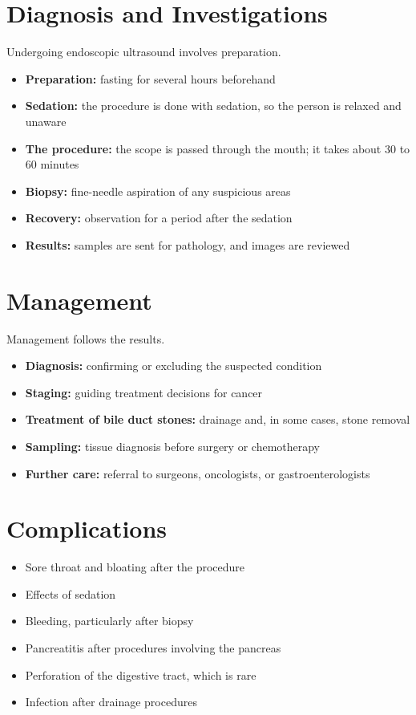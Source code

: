 \section*{Diagnosis and Investigations}
Undergoing endoscopic ultrasound involves preparation.
\begin{itemize}
    \item \textbf{Preparation:} fasting for several hours beforehand
    \item \textbf{Sedation:} the procedure is done with sedation, so the person is relaxed and unaware
    \item \textbf{The procedure:} the scope is passed through the mouth; it takes about 30 to 60 minutes
    \item \textbf{Biopsy:} fine-needle aspiration of any suspicious areas
    \item \textbf{Recovery:} observation for a period after the sedation
    \item \textbf{Results:} samples are sent for pathology, and images are reviewed
\end{itemize}

\section*{Management}
Management follows the results.
\begin{itemize}
    \item \textbf{Diagnosis:} confirming or excluding the suspected condition
    \item \textbf{Staging:} guiding treatment decisions for cancer
    \item \textbf{Treatment of bile duct stones:} drainage and, in some cases, stone removal
    \item \textbf{Sampling:} tissue diagnosis before surgery or chemotherapy
    \item \textbf{Further care:} referral to surgeons, oncologists, or gastroenterologists
\end{itemize}

\section*{Complications}
\begin{itemize}
    \item Sore throat and bloating after the procedure
    \item Effects of sedation
    \item Bleeding, particularly after biopsy
    \item Pancreatitis after procedures involving the pancreas
    \item Perforation of the digestive tract, which is rare
    \item Infection after drainage procedures
\end{itemize}

